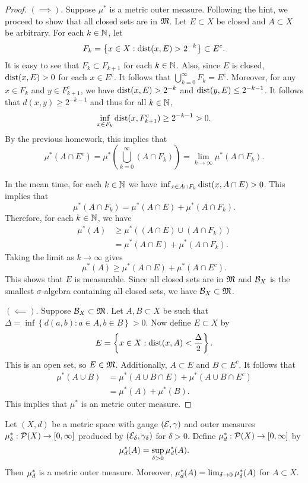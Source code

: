 \documentclass[a4paper]{article}
\renewcommand{\cupinfk}{\bigcup_{k=0}^\infty}
\begin{document}
\begin{proof}
$(\implies)$. Suppose $\mu^*$ is a metric outer measure. 
Following the hint, we proceed to show that all closed 
sets are in $\mathfrak{M}$. Let $E \subset X$ be closed and 
$A \subset X$ be arbitrary. For each $k \in \mathbb{N}$, let
\[
F_k = \left\{ x \in X : \operatorname{dist}(x, E) > 2^{-k} \right\}
\subset E^c.
\]
It is easy to see that $F_k \subset F_{k+1}$ for each $k \in \mathbb{N}$.
Also, since $E$ is closed, $\operatorname{dist}(x, E) > 0$ for each $x \in E^c$.
It follows that $\cupinfk F_k = E^c$.
Moreover, for any $x \in F_k$
and $y \in F_{k+1}^c$, we have $\operatorname{dist}(x, E) > 2^{-k}$
and $\operatorname{dist}(y, E) \leq 2^{-k-1}$. It follows that  
$d(x, y) \geq 2^{-k-1}$ and thus for all $k \in \mathbb{N}$, 
\[
\inf_{x \in F_k} \operatorname{dist}(x, F_{k+1}^c) \geq 2^{-k-1} > 0.
\]
By the previous homework, this implies that 
\[
\mu^* (A \cap E^c) 
= \mu^* \left( \cupinfk (A \cap F_k) \right)
= \lim_{k \to \infty} \mu^* (A \cap F_k).
\]

In the mean time, 
for each $k \in \mathbb{N}$ we have $\inf_{x \in A \cap F_k} 
\operatorname{dist}(x, A \cap E) > 0$. This implies that
\[
\mu^*(A \cap F_k) = \mu^*(A \cap E) + \mu^* (A \cap F_k).
\]
Therefore, for each $k \in \mathbb{N}$, we have 
\[
\begin{aligned}
\mu^*(A) 
&\geq \mu^*((A \cap E) \cup (A \cap F_k)) \\
&= \mu^* (A \cap E) + \mu^*(A \cap F_k).
\end{aligned}
\]
Taking the limit as $k \to \infty$ gives 
\[
\mu^*(A) \geq \mu^*(A \cap E) + \mu^*(A \cap E^c).
\]
This shows that $E$ is measurable. Since 
all closed sets are in $\mathfrak{M}$ and $\mathcal{B}_X$ is the smallest 
$\sigma$-algebra containing all closed sets, we have 
$\mathcal{B}_X \subset \mathfrak{M}$.

$(\impliedby)$. 
Suppose $\mathcal{B}_X \subset \mathfrak{M}$. Let $A, B \subset X$ be 
such that $\Delta = 
\inf \left\{ d(a, b) : a \in A, b \in B \right\} > 0$. 
Now define $E \subset X$ by 
\[
E = \left\{ x \in X: \operatorname{dist}(x, A) < \frac{\Delta}{2} \right\}.
\]
This is an open set, so $E \in \mathfrak{M}$. 
Additionally, $A \subset E$ and $B \subset E^c$. 
It follows that 
\[
\begin{aligned}
\mu^*(A \cup B) 
&= \mu^*(A \cup B \cap E) + \mu^* (A \cup B \cap E^c) \\
&= \mu^*(A) + \mu^*(B).
\end{aligned}
\]
This implies that $\mu^*$ is an metric outer measure.
\end{proof}

\begin{thm}
  Let $(X, d)$ be a metric space with gauge $(\mathcal{E}, \gamma)$
  and outer measures $\mu^*_\delta: \mathcal{P}(X) \to [0, \infty]$
  produced by $(\mathcal{E}_\delta, \gamma_\delta)$ for $\delta > 0$.
  Define $\mu^*_d : \mathcal{P}(X) \to [0, \infty]$ by
  \[
  \mu^*_d(A) = \sup_{\delta > 0} \mu^*_d (A).
  \]
  Then $\mu^*_d$ is a metric outer measure. Moreover,
  $\mu^*_d(A) = \lim_{\delta \to 0} \mu^*_\delta(A)$
  for $A \subset X$.
\end{thm}
\end{document}
